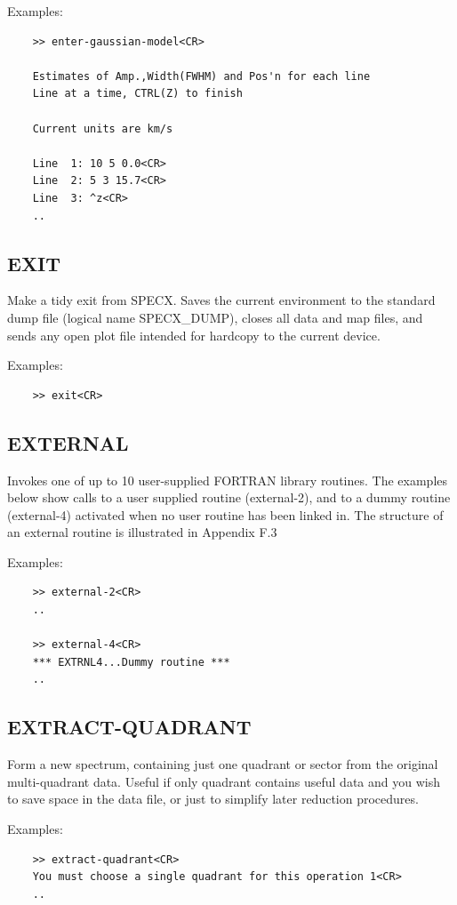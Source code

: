 \documentclass[11pt,twoside]{report}
\begin{document}
Examples:
\begin{verbatim}
    >> enter-gaussian-model<CR>
 
    Estimates of Amp.,Width(FWHM) and Pos'n for each line
    Line at a time, CTRL(Z) to finish

    Current units are km/s  

    Line  1: 10 5 0.0<CR>
    Line  2: 5 3 15.7<CR>
    Line  3: ^z<CR>
    ..
\end{verbatim}

\subsection{EXIT} 

Make a tidy exit from SPECX. Saves the current environment to the standard
dump file (logical name SPECX\_DUMP), closes all data and map files, and sends
any open plot file intended for hardcopy to the current device.

Examples:
\begin{verbatim}
    >> exit<CR>
\end{verbatim}

\subsection{EXTERNAL} 

Invokes one of up to 10 user-supplied FORTRAN library routines. The
examples below show calls to a user supplied routine (external-2), and to a
dummy routine (external-4) activated when no user routine has been linked
in. The structure of an external routine is illustrated in Appendix F.3

Examples:
\begin{verbatim}
    >> external-2<CR>
    ..

    >> external-4<CR>
    *** EXTRNL4...Dummy routine ***
    ..
\end{verbatim}

\subsection{EXTRACT-QUADRANT} 

Form a new spectrum, containing just one quadrant or sector from the
original multi-quadrant data. Useful if only quadrant contains useful data
and you wish to save space in the data file, or just to simplify later
reduction procedures.

Examples:
\begin{verbatim}
    >> extract-quadrant<CR>
    You must choose a single quadrant for this operation 1<CR>
    ..
\end{verbatim}
\end{document}
